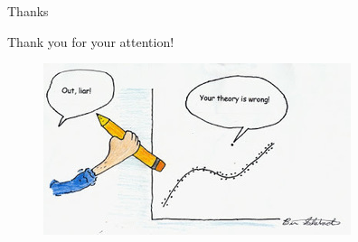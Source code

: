 \documentclass{beamer}\usepackage[]{graphicx}\usepackage[]{color}
\begin{document}
\begin{frame}[fragile]{Thanks}
\begin{center}
Thank you for your attention!\\
\begin{figure}
	\includegraphics[width=0.75\linewidth]{out_liar.jpg}
\end{figure}
\end{center}
\end{frame}
\end{document}
